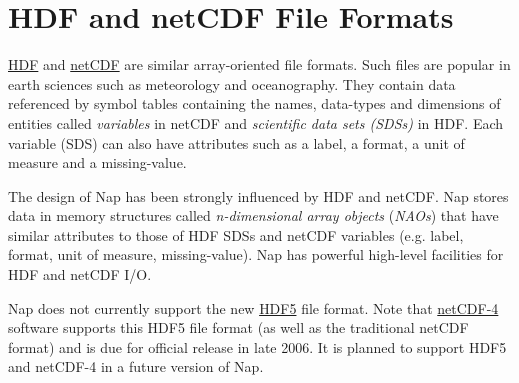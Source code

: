 
\section{HDF and netCDF File Formats} 
    \label{hdf-netcdf}

  \href{http://www.hdfgroup.org/}{HDF} and 
  \href{http://www.unidata.ucar.edu/packages/netcdf/index.html}{netCDF}
  are similar array-oriented file formats.
Such files are popular in earth sciences such as meteorology and oceanography.
They contain data referenced by
symbol tables containing the names, data-types and dimensions of entities called
\emph{variables} in netCDF and \emph{scientific data sets (SDSs)} in HDF.
Each variable (SDS) can also have attributes such as a label, a
  format, a unit of measure and a missing-value. 

The design of Nap has been strongly influenced by HDF and netCDF.
Nap stores data in memory structures called \emph{n-dimensional array objects} (\emph{NAOs})
that have similar attributes to those of HDF SDSs and netCDF variables
(e.g. label, format, unit of measure, missing-value). 
Nap has powerful high-level facilities for HDF and netCDF I/O.

Nap does not currently support the new 
\href{http://www.hdfgroup.org/whatishdf5.html}{HDF5}
file format.
Note that
\href{http://www.unidata.ucar.edu/software/netcdf/netcdf-4/}{netCDF-4} software
supports this HDF5 file format (as well as the traditional netCDF format)
and is due for official release in late 2006.
It is planned to support HDF5 and netCDF-4 in a future version of Nap.
